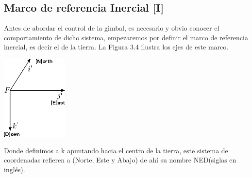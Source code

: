 \subsection{Marco de referencia Inercial [I]}
Antes de abordar el control de la gimbal, es necesario y obvio conocer el comportamiento
de dicho sistema, empezaremos por definir el marco de referencia inercial, es decir
el de la tierra. La Figura 3.4 ilustra los ejes de este marco.
\begin{center}
	\includegraphics[width=0.25\textwidth]{Contenido/Cuerpo/Capitulo3/Fig4.eps}
	\label{fig:ModeloMat:Fig1}
\end{center}
Donde definimos a k apuntando hacia el centro de la tierra, este sistema de coordenadas
refieren a (Norte, Este y Abajo) de ahí su nombre NED(siglas en inglés).

